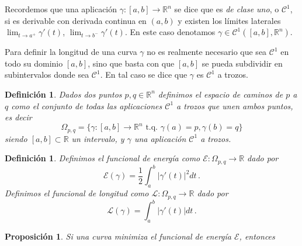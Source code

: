 \documentclass[12pt,reqno]{amsart}
\newcommand{\cC}{\mathcal C}
\newcommand{\cE}{\mathcal E}
\newcommand{\cL}{\mathcal L}
\newcommand{\RR}{\mathbb{R}}
\newcommand{\g}{\gamma}
\renewcommand{\O}{\Omega}
\newtheorem{proposition}[theorem]{Proposici\'on}
\newtheorem{definition}[theorem]{Definici\'on}
\begin{document}
Recordemos que una aplicación $\g:[a,b] \to \RR^n$ se dice que es \emph{de clase uno}, o $\cC^1$,
si es derivable con derivada continua en $(a,b)$ y existen los l\'imites laterales
$\lim_{t \to a^+} \g'(t)$, $\lim_{t \to b^-} \g'(t)$. En este caso denotamos
$\g \in \cC^1([a,b], \RR^n)$.

\medskip

Para definir la longitud de una curva $\g$ no es realmente necesario que sea $\cC^1$ en todo su dominio $[a,b]$, 
sino que basta con que $[a,b]$ se pueda subdividir en subintervalos donde sea $\cC^1$. En tal caso
se dice que $\g$ es $\cC^1$ a trozos.

\begin{definition}
Dados dos puntos $p, q \in \RR^n$ definimos el \emph{espacio de caminos de $p$ a $q$}
como el conjunto de todas las aplicaciones $\cC^1$ a trozos que unen ambos puntos, es decir
$$
\O_{p,q}=\{ \g: [a,b] \to \RR^n \text{ t.q. } \g(a)=p, \g(b)=q \}
$$
siendo $[a,b] \subset \RR$ un intervalo, y $\g$ una aplicaci\'on $\cC^1$ a trozos.
\end{definition}

\begin{definition}
Definimos el funcional de energ\'ia como
$\cE: \O_{p,q} \to \RR$ dado por 
$$
\cE(\g)= \frac{1}{2} \int_a^b |\g'(t)|^2 dt \, .
$$
Definimos el funcional de longitud como $\cL: \O_{p,q} \to \RR$ dado por 
$$
\cL(\g)= \int_a^b |\g'(t)| dt \, .
$$
\end{definition}


\begin{proposition}
Si una curva minimiza el funcional de energ\'ia $\cE$, entonces 

\end{proposition}
\end{document}
